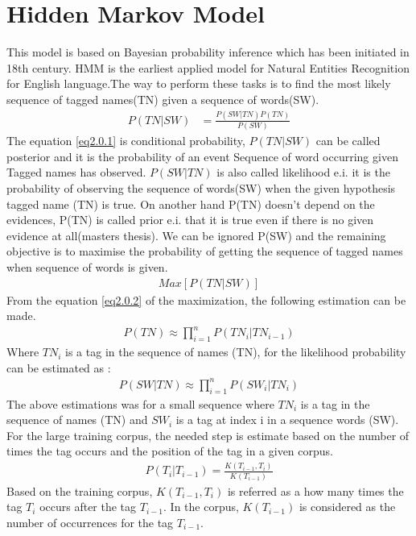 \section{Hidden Markov Model}
This model is based on Bayesian probability inference which has been initiated in 18th century. HMM is the earliest applied model for Natural Entities Recognition for English language.The way to perform these tasks is to find the most likely sequence of tagged names(TN) given a sequence of words(SW).
\begin{align}
P(TN|SW) & = \frac{P(SW|TN)P(TN)}{P(SW)}\label{eq2.0.1}
\end{align}
The equation  \eqref{eq2.0.1} is conditional probability, $P(TN|SW)$ can be  called posterior and it is  the probability of an event Sequence of word occurring given Tagged names has observed. 
$P(SW|TN)$ is also called likelihood e.i.  it is the probability of observing the sequence of words(SW) when the given hypothesis tagged name (TN) is true. On another hand P(TN) doesn’t depend on the evidences, P(TN) is called prior e.i.  that it is true even if there is no given evidence at all(masters thesis). We can be ignored P(SW) and the remaining objective is to maximise the probability of getting the sequence of tagged names when sequence of words is given.
\begin{align}
Max\left[P(TN|SW)\right] \label{eq2.0.2}
\end{align}
From the equation \eqref{eq2.0.2} of the maximization, the following estimation can be made.
\begin{align}
P(TN){\approx} \prod_{i=1}^{n} P({TN}_{i}|{TN}_{i-1})\label{2.0.3}
\end{align}
Where ${TN}_{i}$ is a tag in the sequence of names (TN), for the likelihood probability can be estimated as :
\begin{align}
P(SW|TN){\approx}\prod_{i=1}^{n} P({SW}_{i}|{TN}_{i})\label{2.0.4}
\end{align}
The above estimations was for a small sequence where ${TN}_{i}$ is a tag in the sequence of names (TN) and ${SW}_{i}$ is a tag at index i in a sequence words (SW). For the large training corpus, the needed step is estimate based on the number of times the tag occurs and the position of the tag in a given corpus.
\begin{align}
P(T_{i}|T_{i-1}) = \frac{K(T_{i-1},T_{i})}{K(T_{i-1})}\label{2.0.5}
\end{align}
Based on the training corpus, $K(T_{i-1},T_{i})$ is referred as a how many times the tag $T_{i}$ occurs after the tag $T_{i-1}$. In the corpus, $K(T_{i-1})$ is considered as the number of occurrences for the tag $T_{i-1}$.

